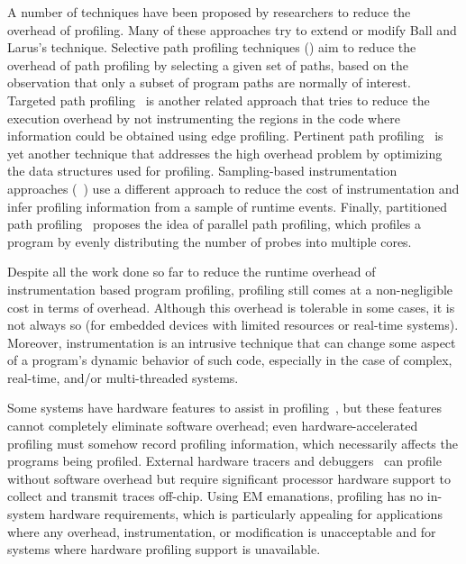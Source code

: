 A number of techniques have been proposed by researchers to reduce the overhead of profiling. Many of these approaches try to extend or modify Ball and Larus's technique. Selective path profiling techniques (\eg \cite{Vaswani:2007:PPP:1190216.1190268,Bond:2005:PPP:1048922.1048988,Apiwattanapong:2002:SPP:586094.586104, ProfilingSelectedPathsWithLoops}) aim to reduce the overhead of path profiling by selecting a given set of paths, based on the observation that only a subset of program paths are normally of interest. Targeted path profiling~\cite{Joshi:2004:TPP:977395.977660} is another related approach that tries to reduce the execution overhead by not instrumenting the regions in the code where information could be obtained using edge profiling. Pertinent path profiling~\cite{Baswana:2013:PPP:2495258.2495922} is yet another technique that addresses the high overhead problem by optimizing the data structures used for profiling. Sampling-based instrumentation approaches (\eg ~\cite{Arnold:2001:FRC:378795.378832,  Traub00ephemeralinstrumentation}) use a different approach to reduce the cost of instrumentation and infer profiling information from a sample of runtime events. Finally, partitioned path profiling~\cite{Afraz:2015:PPP:2786805.2786868} proposes the idea of parallel path profiling, which profiles a program by evenly distributing the number of probes into multiple cores.

Despite all the work done so far to reduce the runtime overhead of instrumentation based program profiling, profiling still comes at a non-negligible cost in terms of overhead. Although this overhead is tolerable in some cases, it is not always so (\eg for embedded devices with limited resources or real-time systems). Moreover, instrumentation is an intrusive technique that can change some aspect of a program's dynamic behavior of such code, especially in the case of complex, real-time, and/or multi-threaded systems. %

Some systems have hardware features to assist in profiling~\cite{intel_vtune, intel_pmu, arm_pmu, shye2005}, but these features cannot completely eliminate software overhead; even hardware-accelerated profiling must somehow record profiling information, which necessarily affects the programs being profiled. External hardware tracers and debuggers~\cite{lauterbach} can profile without software overhead but require significant processor hardware support to collect and transmit traces off-chip. Using EM emanations, profiling has no in-system hardware requirements, which is particularly appealing for applications where any overhead, instrumentation, or modification is unacceptable and for systems where hardware profiling support is unavailable.

